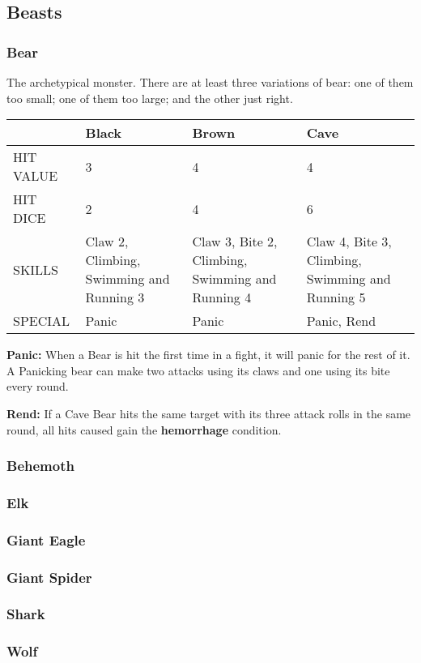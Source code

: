 \subsection{Beasts}
\begin{multicols}{2}
    \subsubsection*{Bear}\label{foe:bear}
    The archetypical monster. There are at least three variations of bear: one of them too small; one of them too large; and the other just right.
    \begin{tabularx}{\columnwidth}{|X|X|X|X|}
        \hline
        & Black & Brown & Cave \\
        \hline
        HIT VALUE & 3 & 4 & 4 \\
        \hline
        HIT DICE & 2 & 4 & 6 \\
        \hline
        SKILLS & Claw 2, Climbing, Swimming and Running 3 & Claw 3, Bite 2, Climbing, Swimming and Running 4 & Claw 4, Bite 3, Climbing, Swimming and Running 5 \\
        \hline
        SPECIAL & Panic & Panic & Panic, Rend \\
        \hline
    \end{tabularx}

    \textbf{Panic:} When a Bear is hit the first time in a fight, it will panic for the rest of it. A Panicking bear can make two attacks using its claws and one using its bite every round.
    
    \textbf{Rend:} If a Cave Bear hits the same target with its three attack rolls in the same round, all hits caused gain the \textbf{hemorrhage} condition.
    \subsubsection*{Behemoth}\label{foe:behemoth}
    \subsubsection*{Elk}\label{foe:elk}
    \subsubsection*{Giant Eagle}\label{foe:giant-eagle}
    \subsubsection*{Giant Spider}\label{foe:giant-spider}
    \subsubsection*{Shark}\label{foe:shark}
    \subsubsection*{Wolf}\label{foe:wolf}
\end{multicols}
